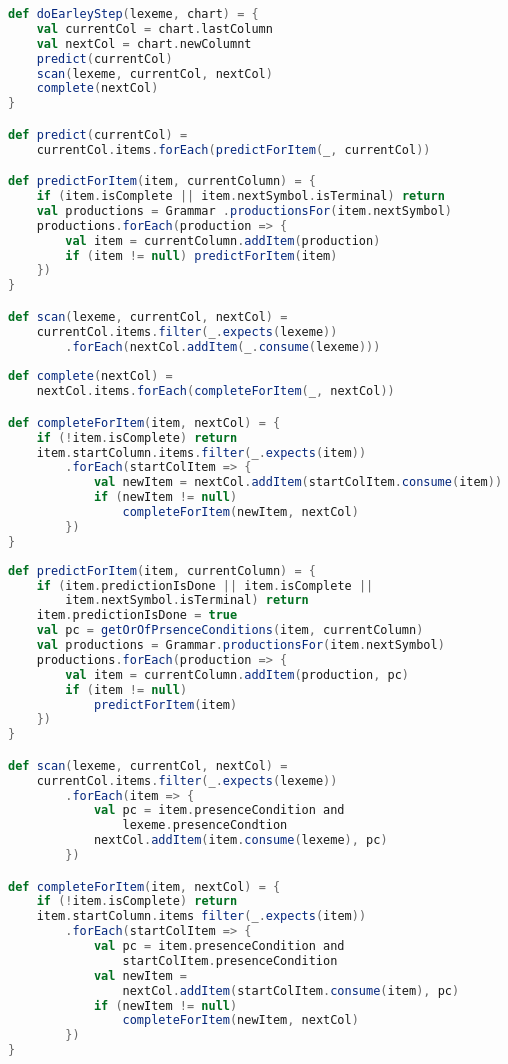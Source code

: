 \begin{minipage}{\linewidth}
\begin{lstlisting}[caption={Псевдокод алгоритма Earley},language=Scala,label=earleyrecognizer]
def doEarleyStep(lexeme, chart) = {
	val currentCol = chart.lastColumn
	val nextCol = chart.newColumnt
	predict(currentCol)
	scan(lexeme, currentCol, nextCol)
	complete(nextCol)
}

def predict(currentCol) = 
	currentCol.items.forEach(predictForItem(_, currentCol))

def predictForItem(item, currentColumn) = {
	if (item.isComplete || item.nextSymbol.isTerminal) return
	val productions = Grammar .productionsFor(item.nextSymbol)
	productions.forEach(production => {
		val item = currentColumn.addItem(production)
		if (item != null) predictForItem(item)
	})
}

def scan(lexeme, currentCol, nextCol) = 
	currentCol.items.filter(_.expects(lexeme))
		.forEach(nextCol.addItem(_.consume(lexeme)))
	
def complete(nextCol) = 
	nextCol.items.forEach(completeForItem(_, nextCol))

def completeForItem(item, nextCol) = {
	if (!item.isComplete) return
	item.startColumn.items.filter(_.expects(item))
		.forEach(startColItem => {
			val newItem = nextCol.addItem(startColItem.consume(item))
			if (newItem != null)
				completeForItem(newItem, nextCol)		
		})
}
\end{lstlisting}
\end{minipage}



\begin{minipage}{\linewidth}
\begin{lstlisting}[caption={Псевдокод модифицированных процедур алгоритма Earley},language=Scala,label=modearleyprocs]
def predictForItem(item, currentColumn) = {
	if (item.predictionIsDone || item.isComplete || 
		item.nextSymbol.isTerminal) return
	item.predictionIsDone = true
	val pc = getOrOfPrsenceConditions(item, currentColumn)
	val productions = Grammar.productionsFor(item.nextSymbol)
	productions.forEach(production => {
		val item = currentColumn.addItem(production, pc)
		if (item != null)
			predictForItem(item)
	})
}

def scan(lexeme, currentCol, nextCol) = 
	currentCol.items.filter(_.expects(lexeme))
		.forEach(item => {
			val pc = item.presenceCondition and
				lexeme.presenceCondtion
			nextCol.addItem(item.consume(lexeme), pc)
		})

def completeForItem(item, nextCol) = {
	if (!item.isComplete) return
	item.startColumn.items filter(_.expects(item))
		.forEach(startColItem => {
			val pc = item.presenceCondition and 
				startColItem.presenceCondition
			val newItem = 
				nextCol.addItem(startColItem.consume(item), pc)
			if (newItem != null)
				completeForItem(newItem, nextCol)		
		})
}
\end{lstlisting}
\end{minipage}

